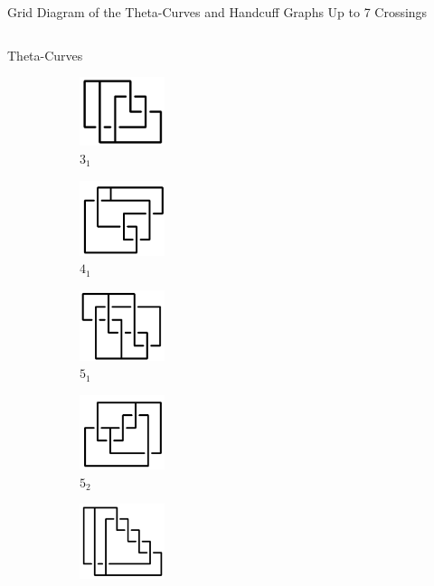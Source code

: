 \documentclass[final]{beamer}
\begin{document}
\begin{frame}[t]
 \begin{alertblock}{Grid Diagram of the Theta-Curves and Handcuff Graphs Up to 7 Crossings}
  \hspace{1cm}
  \begin{columns}[t]
  \begin{column}{0.7\textwidth}
  \begin{alertblock}{Theta-Curves}
  \begin{figure}
    \begin{subfigure}{0.075\textwidth}
    \includegraphics[width=2.5cm]{../Midterm_Poster/grid_diagram/theta_3_1.png}
    \caption{$3_1$} 
    \end{subfigure}
    \begin{subfigure}{0.075\textwidth}
    \includegraphics[width=2.5cm]{../Midterm_Poster/grid_diagram/theta_4_1.png}
    \caption{$4_1$} 
    \end{subfigure}
    \begin{subfigure}{0.075\textwidth}
    \includegraphics[width=2.5cm]{../Midterm_Poster/grid_diagram/theta_5_1.png}
    \caption{$5_1$}
    \end{subfigure}
    \begin{subfigure}{0.075\textwidth}
    \includegraphics[width=2.5cm]{../Midterm_Poster/grid_diagram/theta_5_2.png}
    \caption{$5_2$} 
    \end{subfigure}
    \begin{subfigure}{0.075\textwidth}
    \includegraphics[width=2.5cm]{../Midterm_Poster/grid_diagram/theta_5_3.png}

\end{subfigure}
\end{figure}
\end{alertblock}
\end{column}
\end{columns}
\end{alertblock}
\end{frame}
\end{document}
